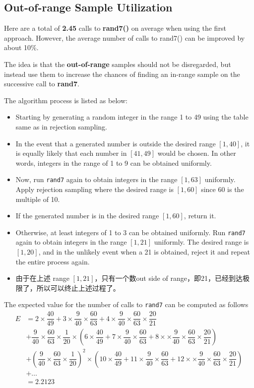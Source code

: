 \subsection{Out-of-range Sample Utilization}
Here are a total of \textbf{2.45} calls to \textbf{rand7()} on average when using the first approach. However, the average number of calls to rand7() can be improved by about 10\%.

The idea is that the \textbf{out-of-range} samples should not be disregarded, but instead use them to increase the chances of finding an in-range sample on the successive call to \textbf{rand7}.

The algorithm process is listed as below:

\begin{itemize}
\item Starting by generating a random integer in the range 1 to 49 using the table same as in rejection sampling. 
\item In the event that a generated number is outside the desired range $[1,40]$, it is equally likely that each number in $[41,49]$ would be chosen. In other words, integers in the range of 1 to 9 can be obtained uniformly. 
\item Now, run \texttt{rand7} again to obtain integers in the range $[1,63]$ uniformly. Apply rejection sampling where the desired range is $[1,60]$ since 60 is the multiple of 10. 
\item If the generated number is in the desired range $[1,60]$, return it. 
\item Otherwise, at least integers of 1 to 3 can be obtained uniformly. Run \texttt{rand7} again to obtain integers in the range $[1,21]$ uniformly. The desired range is $[1,20]$, and in the unlikely event when a 21 is obtained, reject it and repeat the entire process again.
\item 由于在上述 range $[1,21]$，只有一个数out side of range，即21，已经到达极限了，所以可以终止上述过程了。
\end{itemize}

The expected value for the number of calls to \texttt{rand7} can be computed as follows
\begin{align*}
E &= 2\times \dfrac{40}{49} + 3\times \dfrac{9}{40} \times \dfrac{60}{63} + 4\times \dfrac{9}{40} \times \dfrac{60}{63} \times \dfrac{20}{21}  \\
  &+ \dfrac{9}{40} \times \dfrac{60}{63} \times \dfrac{1}{20} \times \left(6\times \dfrac{40}{49} + 7 \times \dfrac{9}{40} \times \dfrac{60}{63} + 8 \times \times \dfrac{9}{40} \times \dfrac{60}{63} \times \dfrac{20}{21}\right) \\
  &+ \left(\dfrac{9}{40} \times \dfrac{60}{63} \times \dfrac{1}{20}\right)^2\times \left(10\times \dfrac{40}{49} + 11 \times \dfrac{9}{40} \times \dfrac{60}{63} + 12 \times \times \dfrac{9}{40} \times \dfrac{60}{63} \times \dfrac{20}{21}\right) \\
  &+ \ldots \\
  &= 2.2123 
\end{align*}

